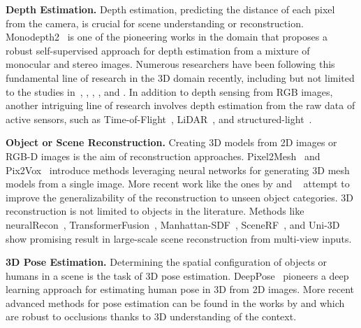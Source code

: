 \vspace{1ex}
\noindent\textbf{Depth Estimation.} Depth estimation, predicting the distance of each pixel from the camera, is crucial for scene understanding or reconstruction. Monodepth2~\citep{godard2019digging} is one of the pioneering works in the domain that proposes a robust self-supervised approach for depth estimation from a mixture of monocular and stereo images. Numerous researchers have been following this fundamental line of research in the 3D domain recently, including but not limited to the studies in~\cite{zhao2023gasmono}, \cite{shao2023nddepth}, \cite{yang2023gedepth}, \cite{zhou2023two}, and \cite{piccinelli2023idisc}. In addition to depth sensing from RGB images, another intriguing line of research involves depth estimation from the raw data of active sensors, such as Time-of-Flight~\citep{li2022deltar}, LiDAR~\citep{bartoccioni2023lidartouch}, and structured-light~\citep{riegler2019connecting}.

\vspace{1ex}
\noindent\textbf{Object or Scene Reconstruction.} Creating 3D models from 2D images or RGB-D images is the aim of reconstruction approaches. Pixel2Mesh~\citep{wang2018pixel2mesh} and Pix2Vox~\citep{xie2019pix2vox} introduce methods leveraging neural networks for generating 3D mesh models from a single image. More recent work like the ones by \cite{yang2023single} and ~\cite{zhang2022monocular} attempt to improve the generalizability of the reconstruction to unseen object categories. 3D reconstruction is not limited to objects in the literature. Methods like neuralRecon~\citep{sun2021neuralrecon}, TransformerFusion~\citep{bozic2021transformerfusion}, Manhattan-SDF~\citep{guo2022neural}, SceneRF~\citep{cao2023scenerf}, and Uni-3D~\citep{zhang2023uni} show promising result in large-scale scene reconstruction from multi-view inputs.

\vspace{1ex}
\noindent\textbf{3D Pose Estimation.} Determining the spatial configuration of objects or humans in a scene is the task of 3D pose estimation. DeepPose~\citep{toshev2014deeppose} pioneers a deep learning approach for estimating human pose in 3D from 2D images. More recent advanced methods for pose estimation can be found in the works by \cite{zhang20233d} and \cite{zhou2023deep} which are robust to occlusions thanks to 3D understanding of the context.

